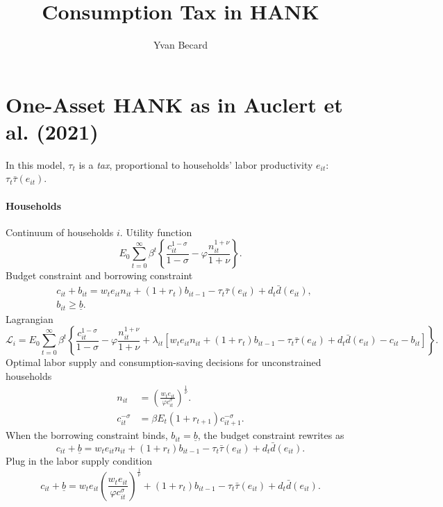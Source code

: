 \documentclass[11pt,a4paper]{article}
\begin{document}
\title{Consumption Tax in HANK}
\author{Yvan Becard}
\maketitle



\section{One-Asset HANK as in Auclert et al. (2021)}
\label{hank}
In this model, $\tau_t$ is a \textit{tax}, proportional to households' labor productivity $e_{it}$: $\tau_t\bar{\tau}(e_{it})$.

\paragraph{Households}
Continuum of households $i$. Utility function
\begin{equation*}
E_0\sum_{t=0}^{\infty}\beta^t\left\{\frac{c_{it}^{1-\sigma}}{1-\sigma}-\varphi\frac{n_{it}^{1+\nu}}{1+\nu}\right\}.
\end{equation*}
Budget constraint and borrowing constraint
\begin{align*}
&c_{it}+b_{it}=w_te_{it}n_{it}+(1+r_t)b_{it-1}-\tau_t\bar{\tau}(e_{it})+d_t\bar{d}(e_{it}),\\
&b_{it}\geq\underline{b}.
\end{align*}
Lagrangian
\begin{equation*}
\mathcal{L}_i=E_0\sum_{t=0}^{\infty}\beta^t\left\lbrace \frac{c_{it}^{1-\sigma}}{1-\sigma}-\varphi\frac{n_{it}^{1+\nu}}{1+\nu}+\lambda_{it}\left[w_te_{it}n_{it}+(1+r_t)b_{it-1}-\tau_t\bar{\tau}(e_{it})+d_t\bar{d}(e_{it})-c_{it}-b_{it}\right]\right\rbrace.
\end{equation*}
Optimal labor supply and consumption-saving decisions for unconstrained households
\begin{align*}
n_{it}&=\left(\frac{w_te_{it}}{\varphi c_{it}^{\sigma}}\right)^{\frac{1}{\nu}}.\\
c_{it}^{-\sigma}&=\beta E_t(1+r_{t+1})c_{it+1}^{-\sigma}.
\end{align*}
When the borrowing constraint binds, $b_{it}=\underline{b}$, the budget constraint rewrites as
\begin{equation*}
c_{it}+\underline{b}=w_te_{it}n_{it}+(1+r_t)b_{it-1}-\tau_t\bar{\tau}(e_{it})+d_t\bar{d}(e_{it}).
\end{equation*}
Plug in the labor supply condition
\begin{equation*}
c_{it}+\underline{b}=w_te_{it}\left(\frac{w_te_{it}}{\varphi c_{it}^{\sigma}}\right)^{\frac{1}{\nu}}+(1+r_t)b_{it-1}-\tau_t\bar{\tau}(e_{it})+d_t\bar{d}(e_{it}).
\end{equation*}
\end{document}
